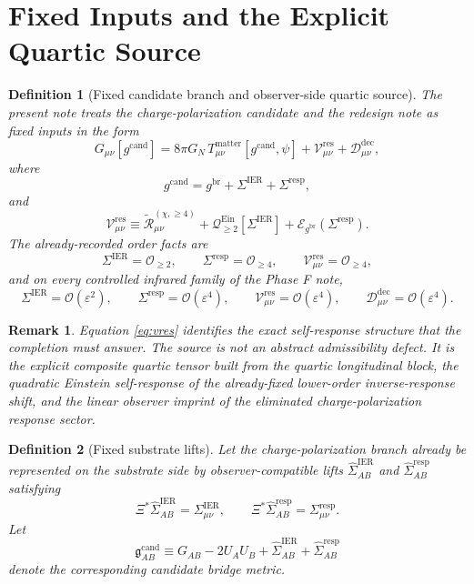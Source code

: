 \documentclass[11pt]{article}
\newcommand{\ObserverMap}{\Xi}
\newcommand{\BridgeMetric}{\mathfrak g}
\newcommand{\ObserverMetric}{g^{\mathrm{br}}}
\newcommand{\CandidateMetric}{g^{\mathrm{cand}}}
\newcommand{\BaseShift}{\Sigma^{\mathrm{IER}}}
\newcommand{\ResponseShift}{\Sigma^{\mathrm{resp}}}
\newcommand{\BaseLift}{\widehat\Sigma^{\mathrm{IER}}}
\newcommand{\ResponseLift}{\widehat\Sigma^{\mathrm{resp}}}
\newcommand{\ReLongFour}{\widetilde{\mathcal R}_{\mu\nu}^{(\chi,\ge 4)}}
\newcommand{\ResidualCore}{\mathcal V_{\mu\nu}^{\mathrm{res}}}
\newcommand{\ResidualDec}{\mathcal D_{\mu\nu}^{\mathrm{dec}}}
\newcommand{\EinLin}{\mathcal E_{\ObserverMetric}}
\newcommand{\EinQuad}{\mathcal Q_{\ge 2}^{\mathrm{Ein}}}
\newcommand{\epsIR}{\varepsilon}
\newtheorem{definition}{Definition}
\newtheorem{remark}{Remark}
\begin{document}
\section{Fixed Inputs and the Explicit Quartic Source}

\begin{definition}[Fixed candidate branch and observer-side quartic source]
\label{def:fixed}
The present note treats the charge-polarization candidate and the redesign note as fixed inputs in the form
\begin{equation}
G_{\mu\nu}[\CandidateMetric]
=
8\pi G_N\,T_{\mu\nu}^{\mathrm{matter}}[\CandidateMetric,\psi]
+\ResidualCore+\ResidualDec,
\label{eq:candobs}
\end{equation}
where
\begin{equation}
\CandidateMetric
=
\ObserverMetric+\BaseShift+\ResponseShift,
\label{eq:gcand}
\end{equation}
and
\begin{equation}
\ResidualCore
\equiv
\ReLongFour
+\EinQuad[\BaseShift]
+\EinLin(\ResponseShift).
\label{eq:vres}
\end{equation}
The already-recorded order facts are
\begin{equation}
\BaseShift=\mathcal O_{\ge 2},
\qquad
\ResponseShift=\mathcal O_{\ge 4},
\qquad
\ResidualCore=\mathcal O_{\ge 4},
\label{eq:orders}
\end{equation}
and on every controlled infrared family of the Phase F note,
\begin{equation}
\BaseShift=\mathcal O(\epsIR^2),
\qquad
\ResponseShift=\mathcal O(\epsIR^4),
\qquad
\ResidualCore=\mathcal O(\epsIR^4),
\qquad
\ResidualDec=\mathcal O(\epsIR^4).
\label{eq:phaseF}
\end{equation}
\end{definition}

\begin{remark}
Equation \eqref{eq:vres} identifies the exact self-response structure that the completion must answer. The source is not an abstract admissibility defect. It is the explicit composite quartic tensor built from the quartic longitudinal block, the quadratic Einstein self-response of the already-fixed lower-order inverse-response shift, and the linear observer imprint of the eliminated charge-polarization response sector.
\end{remark}

\begin{definition}[Fixed substrate lifts]
\label{def:lifts}
Let the charge-polarization branch already be represented on the substrate side by observer-compatible lifts \(\BaseLift_{AB}\) and \(\ResponseLift_{AB}\) satisfying
\begin{equation}
\ObserverMap^*\BaseLift_{AB}=\BaseShift_{\mu\nu},
\qquad
\ObserverMap^*\ResponseLift_{AB}=\ResponseShift_{\mu\nu}.
\label{eq:baselift}
\end{equation}
Let
\begin{equation}
\BridgeMetric_{AB}^{\mathrm{cand}}
\equiv
G_{AB}-2U_AU_B+\BaseLift_{AB}+\ResponseLift_{AB}
\label{eq:bridgecand}
\end{equation}
denote the corresponding candidate bridge metric.
\end{definition}
\end{document}
